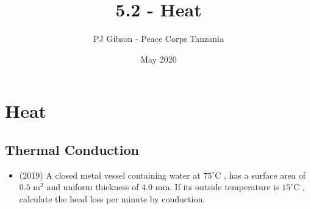 \documentclass{article}
\title{5.2 - Heat}
\author{PJ Gibson - Peace Corps Tanzania}
\date{May 2020}
\begin{document}
\maketitle


\section{Heat}

\subsection{Thermal Conduction}
\begin{itemize}
\item (2019)  A closed metal vessel containing water at $ 75^{\circ}$C , has a surface area of $ 0.5$ m$ ^{2}$ and uniform thickness of $ 4.0$ mm.  If its outside temperature is $ 15^{\circ}$C , calculate the head loss per minute by conduction.
\end{itemize}
\end{document}
